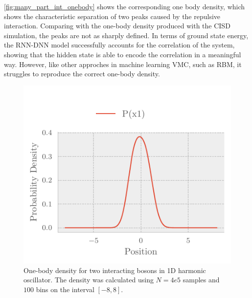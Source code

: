 \autoref{fig:many_part_int_onebody} shows the corresponding one body density, which shows the characteristic separation of two peaks caused by the repulsive interaction. Comparing with the one-body density produced with the CISD simulation, the peaks are not as sharply defined. In terms of ground state energy, the RNN-DNN model successfully accounts for the correlation of the system, showing that the hidden state is able to encode the correlation in a meaningful way. However, like other approches in machine learning VMC, such as RBM, it struggles to reproduce the correct one-body density. 

\begin{figure}[H]
	\includegraphics[]{figures/many_part_con1.pdf}
	\caption{One-body density for two interacting bosons in 1D harmonic oscillator. The density was calculated using $N=4e5$ samples and $100$ bins on the interval $[-8,8]$.}
	\label{fig:many_part_con1.pdf}
\end{figure}

